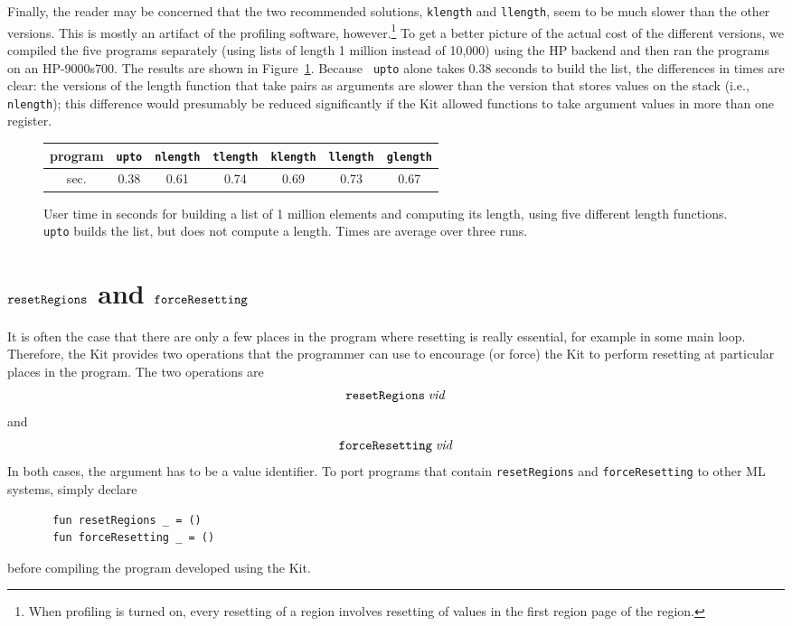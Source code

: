 \documentclass[12pt]{book}
\begin{document}
Finally, the reader may be concerned that the two recommended
solutions, {\tt klength} and {\tt llength}, seem to be much slower
than the other versions. This is mostly an artifact of the profiling
software, however.\footnote{When profiling is turned on, every
  resetting of a region involves resetting of values in the first
  region page of the region.} To get a better picture of the actual
cost of the different versions, we compiled the five programs
separately (using lists of length 1 million instead of 10,000) using
the HP backend and then ran the programs on an HP-9000s700. The
results are shown in Figure~\ref{length.timing.fig}. Because {\tt
  upto} alone takes 0.38 seconds to build the list, the differences in
times are clear: the versions of the length function that take pairs
as arguments are slower than the version that stores values on the
stack (i.e., {\tt nlength}); this difference would presumably be
reduced significantly if the Kit allowed functions to take argument
values in more than one register.

\begin{figure}
\begin{center}
\begin{tabular}{|c|c|c|c|c|c|c|}\hline
program      & {\tt upto} & {\tt nlength} & {\tt tlength} & {\tt klength} & {\tt llength} & {\tt glength} \\ \hline
sec. & 0.38 & 0.61 & 0.74 & 0.69 & 0.73 & 0.67 \\ \hline
\end{tabular}
\end{center}
\caption{User time in seconds for building a list of 1 million elements and
computing its length, using five different length functions. {\tt upto} builds
the list, but does not compute a length. Times are average
over three runs.}
\label{length.timing.fig}
\end{figure}

\section{$\hbox{\tt resetRegions}$ and $\hbox{\tt forceResetting}$}
It is often the case that there are
only a few places in the program where resetting is really essential,
for example in some main loop.
Therefore, the Kit provides two operations that the programmer can use
to encourage (or force) the Kit to perform resetting at particular
places in the program. The two operations are 
$$\hbox{\tt resetRegions}\; {\it vid}$$
and 
$$\hbox{\tt forceResetting}\; {\it vid}$$
In both cases, the argument has to be a value identifier. 
To port programs that contain {\tt resetRegions}
and {\tt forceResetting} to other ML systems, simply declare
\begin{verbatim}
       fun resetRegions _ = ()
       fun forceResetting _ = ()
\end{verbatim}
before compiling the program developed using the Kit.
\end{document}
